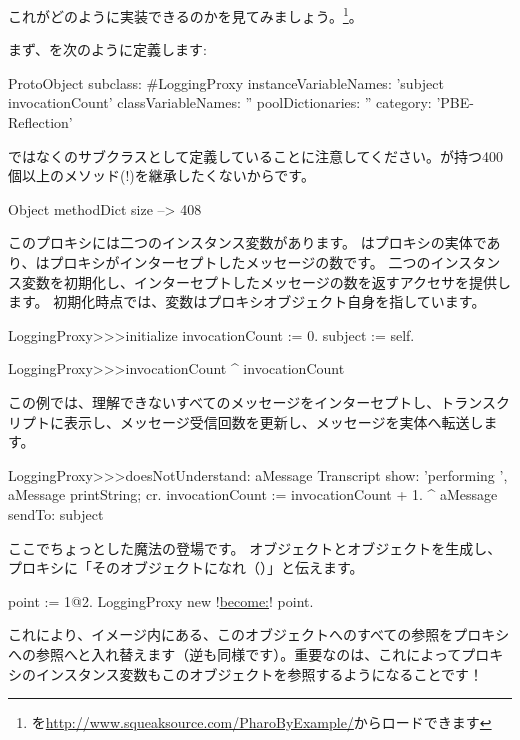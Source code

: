 \documentclass[a4paper,10pt,twoside]{book}
\begin{document}
これがどのように実装できるのかを見てみましょう。\footnote{を\url{http://www.squeaksource.com/PharoByExample/}からロードできます}。

まず、を次のように定義します:
\begin{code}{}
ProtoObject subclass: #LoggingProxy
	instanceVariableNames: 'subject invocationCount'
	classVariableNames: ''
	poolDictionaries: ''
	category: 'PBE-Reflection'
\end{code}
ではなくのサブクラスとして定義していることに注意してください。が持つ400個以上のメソッド(!)を継承したくないからです。

\begin{code}{}
Object methodDict size --> 408
\end{code}

このプロキシには二つのインスタンス変数があります。  はプロキシの実体であり、はプロキシがインターセプトしたメッセージの数です。
二つのインスタンス変数を初期化し、インターセプトしたメッセージの数を返すアクセサを提供します。
初期化時点では、変数はプロキシオブジェクト自身を指しています。
\begin{code}{}
LoggingProxy>>>initialize
	invocationCount := 0.
	subject := self.
\end{code}

\begin{code}{}
LoggingProxy>>>invocationCount
	^ invocationCount
\end{code}

この例では、理解できないすべてのメッセージをインターセプトし、トランスクリプトに表示し、メッセージ受信回数を更新し、メッセージを実体へ転送します。
\begin{code}{}
LoggingProxy>>>doesNotUnderstand: aMessage 
	Transcript show: 'performing ', aMessage printString; cr.
	invocationCount := invocationCount + 1.
	^ aMessage sendTo: subject
\end{code}

ここでちょっとした魔法の登場です。
オブジェクトとオブジェクトを生成し、プロキシに「そのオブジェクトになれ（）」と伝えます。
\begin{code}{}
point := 1@2.
LoggingProxy new !\underline{become:}! point.
\end{code}

これにより、イメージ内にある、このオブジェクトへのすべての参照をプロキシへの参照へと入れ替えます（逆も同様です）。重要なのは、これによってプロキシのインスタンス変数もこのオブジェクトを参照するようになることです！
\end{document}
